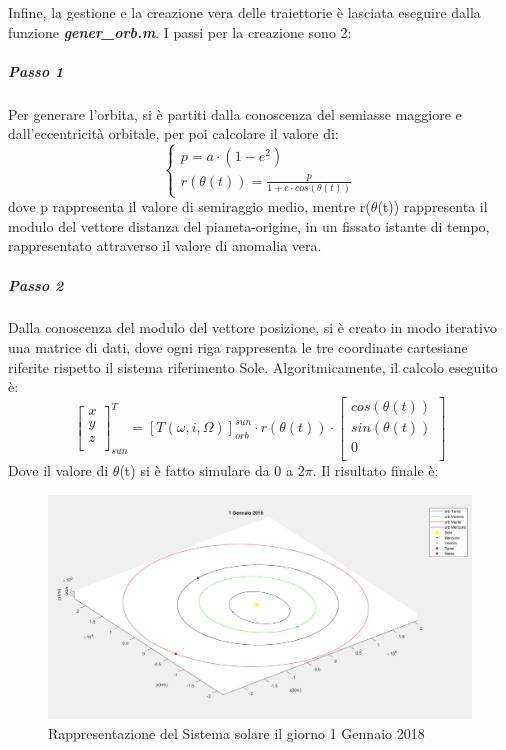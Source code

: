 \documentclass[a4paper]{article}
\begin{document}
Infine, la gestione e la creazione vera delle traiettorie è lasciata eseguire dalla funzione \textit{\textbf{gener\_orb.m}}. I passi per la creazione sono 2:
\subparagraph{Passo 1\newline}
Per generare l'orbita, si è partiti dalla conoscenza del semiasse maggiore e dall'eccentricità orbitale, per poi calcolare il valore di:
\[
\begin{cases}
p = a \cdot (1-e^2) \\
r(\theta(t)) = \frac{p}{1+e\cdot cos(\theta(t))}
\end{cases}
\]\newline
dove p rappresenta il valore di semiraggio medio, mentre r($\theta$(t)) rappresenta il modulo del vettore distanza del pianeta-origine, in un fissato istante di tempo, rappresentato attraverso il valore di anomalia vera.
\subparagraph{Passo 2\newline}
Dalla conoscenza del modulo del vettore posizione, si è creato in modo iterativo una matrice di dati, dove ogni riga rappresenta le tre coordinate cartesiane riferite rispetto il sistema riferimento Sole. Algoritmicamente, il calcolo eseguito è:
\[
\begin{bmatrix}
x \\
y \\
z \\
\end{bmatrix}_{sun}^{T} = {[T(\omega,\textit{i},\Omega)]}_{orb}^{sun} \cdot r(\theta(t)) \cdot
\begin{bmatrix}
cos(\theta(t)) \\
sin(\theta(t)) \\
0 \\
\end{bmatrix}
\]\newline
Dove il valore di $\theta$(t) si è fatto simulare da 0 a 2$\pi$. Il risultato finale è:
\begin{figure}[htbp]
\includegraphics[width=1\textwidth]{Sistema_solareJ2018.png}
\caption{Rappresentazione del Sistema solare il giorno 1 Gennaio 2018}
\end{figure}
\end{document}
